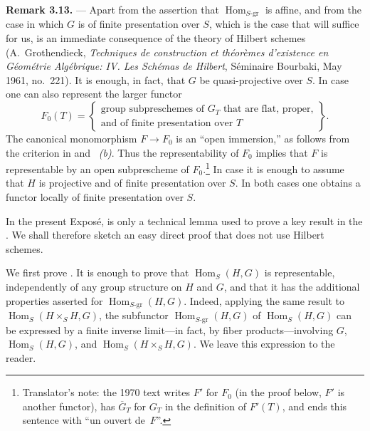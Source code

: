 \medskip
\noindent{}\textbf{Remark 3.13.} ---
Apart from the assertion that
\(\operatorname{Hom}_{S\text{-}\mathrm{gr}}\) is affine, and from the
case in which \(G\) is of finite presentation over \(S\), which is
the case that will suffice for us,
 is an immediate
consequence of the theory of Hilbert schemes (A.~Grothendieck,
\textit{Techniques de construction et théorèmes d'existence en
Géométrie Algébrique: IV. Les Schémas de Hilbert}, Séminaire
Bourbaki, May 1961, no.~221).  It is enough, in fact, that \(G\) be
quasi-projective over \(S\).  In case \textit{} one can also
represent the larger functor
\[
  F_0(T)=
  \left\{
  \begin{array}{c}
  \text{group subpreschemes of \(G_T\) that are flat, proper,}\\
  \text{and of finite presentation over \(T\)}
  \end{array}
  \right\}.
\]
The canonical monomorphism \(F\to F_0\) is an ``open immersion,'' as
follows from the criterion in  and ~\textit{(b)}.
Thus the representability of \(F_0\) implies that \(F\) is
representable by an open subprescheme of \(F_0\).\footnote{Translator's note: the 1970 text
writes \(F'\) for \(F_0\) (in the proof below, \(F'\) is another functor), has
\(\overline G_T\) for \(G_T\) in the definition of \(F'(T)\), and ends this sentence with
``un ouvert de~\(F\)''.}  In case \textit{}
it is enough to assume that \(H\) is projective and of finite
presentation over \(S\).  In both cases one obtains a functor locally
of finite presentation over \(S\).

In the present Exposé,  is
only a technical lemma used to prove a key result in the .  We shall therefore sketch an easy direct proof that does
not use Hilbert schemes.

We first prove \textit{}.  It is enough to prove that
\(\operatorname{Hom}_S(H,G)\) is representable, independently of any
group structure on \(H\) and \(G\), and that it has the additional
properties asserted for
\(\operatorname{Hom}_{S\text{-}\mathrm{gr}}(H,G)\).  Indeed, applying
the same result to \(\operatorname{Hom}_S(H\times_S H,G)\), the
subfunctor
\(\operatorname{Hom}_{S\text{-}\mathrm{gr}}(H,G)\) of
\(\operatorname{Hom}_S(H,G)\) can be expressed by a finite inverse
limit---in fact, by fiber products---involving \(G\),
\(\operatorname{Hom}_S(H,G)\), and
\(\operatorname{Hom}_S(H\times_S H,G)\).  We leave this expression
to the reader.


